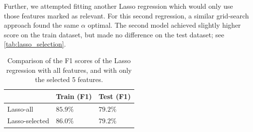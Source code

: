 Further, we attempted fitting another Lasso regression which would only use those features marked as relevant. For this second regression, a similar grid-search approach found the same $\alpha$ optimal. The second model achieved slightly higher score on the train dataset, but made no difference on the test dataset; see \autoref{tab:lasso_selection}.

\begin{table}
\centering
\begin{tabular}{l|l|l|}
 & Train (F1) & Test (F1) \\ \hline
Lasso-all & $85.9\%$ & $79.2\%$ \\ \hline
Lasso-selected & $86.0\%$ & \textbf{$79.2\%$} \\ \hline
\end{tabular}
\caption{Comparison of the F1 scores of the Lasso regression with all features, and with only the selected 5 features.}
\label{tab:lasso_selection}
\end{table}
